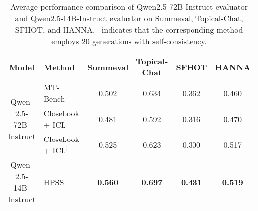 \begin{table*} [!t]
\centering
\small
\begin{tabular}{c|l|c|c|c|c}
\toprule
\textbf{Model} & \textbf{Method}  & \textbf{Summeval} & \textbf{Topical-Chat} & \textbf{SFHOT} & \textbf{HANNA}  \\
\midrule
\multirow{3}{*}{Qwen-2.5-72B-Instruct} & MT-Bench  & 0.502  &  0.634  & 0.362  &  0.460   \\
& CloseLook + ICL  &  0.481  & 0.592 & 0.316 & 0.470     \\
& CloseLook + ICL$^{\dag}$  & 0.525 &  0.623 & 0.300  & 0.517  \\
\midrule
Qwen-2.5-14B-Instruct & HPSS & \textbf{0.560}  &  \textbf{0.697}  &  \textbf{0.431} & \textbf{0.519}   \\
\bottomrule
\end{tabular}
\vspace{-2mm}
\caption{Average performance comparison of Qwen2.5-72B-Instruct evaluator and Qwen2.5-14B-Instruct evaluator on Summeval, Topical-Chat, SFHOT, and HANNA. \dag \  indicates that the corresponding method employs 20 generations with self-consistency.}
\label{tab:stronger_model}
\end{table*}